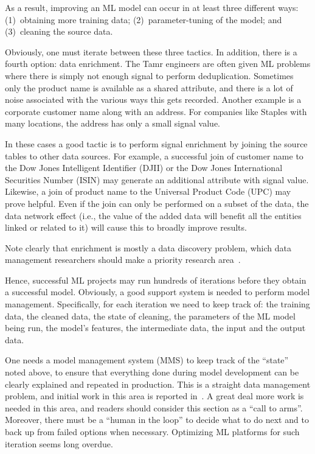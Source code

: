 \documentclass[11pt]{article}
\begin{document}
As a result, improving an ML model can occur in at least three different ways: (1)~obtaining more training data; (2)~parameter-tuning of the model; and (3)~cleaning the source data.

Obviously, one must iterate between these three tactics.  In addition, there is a fourth option: data enrichment. The Tamr engineers are often given ML problems where there is simply not enough signal
to perform deduplication.  Sometimes only the product name is available as a shared attribute, and there is a lot of noise associated with the various ways this gets recorded.  Another example is a corporate customer name along with an address.  For companies like Staples with many locations, the address has only a small signal value.  

In these cases a good tactic is to perform signal enrichment by joining the source tables to other
data sources.  For example, a successful join of customer name to the Dow Jones Intelligent Identifier (DJII) or the Dow Jones International Securities Number (ISIN) may generate an additional attribute with signal value.  Likewise, a join of product name to the Universal Product Code (UPC) may prove helpful. Even if the join can only be performed on a subset of the data, the data network effect (i.e., the value of the added data will benefit all the entities linked or related to it) will cause this to broadly improve results. 

Note clearly that enrichment is mostly a data discovery problem, which data management researchers should make a priority research area~\cite{4,5}.

Hence, successful ML projects may run hundreds of iterations before they obtain a successful model.  Obviously, a good support system is needed to perform model management.  Specifically, for each iteration we need to keep track of: the training data, the cleaned data, the state of cleaning, the parameters of the ML model being run, the model’s features, the intermediate data, the input and the output data.

One needs a model management system (MMS) to keep track of the ``state'' noted above, to ensure that everything done during model development can be clearly explained and repeated in production.  This is a straight data management problem, and initial work in this area is reported in~\cite{9}.  A great deal more work is needed in this area, and readers should consider this section as a “call to arms”.  Moreover, there must be a “human in the loop” to decide what to do next and to back up from failed options when necessary. Optimizing ML platforms for such iteration seems long overdue.
\end{document}
